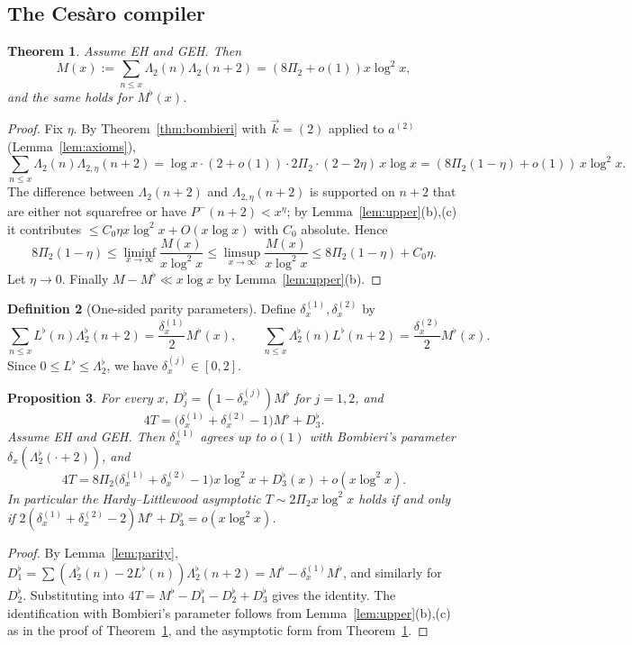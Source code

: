 \documentclass[11pt]{amsart}
\newtheorem{theorem}{Theorem}[section]
\newtheorem{proposition}[theorem]{Proposition}
\theoremstyle{definition}
\newtheorem{definition}[theorem]{Definition}
\theoremstyle{remark}
\newcommand{\Lflat}{\Lambda_2^{\flat}}
\begin{document}
\subsection{The Cesàro compiler}
\begin{theorem}\label{thm:M}
Assume EH and GEH. Then
\[
M(x):=\sum_{n\le x}\Lambda_2(n)\Lambda_2(n+2)=(8\Pi_2+o(1))x\log^2x,
\]
and the same holds for $M^\flat(x)$.
\end{theorem}
\begin{proof}
Fix $\eta$. By Theorem~\ref{thm:bombieri} with $\vec k=(2)$ applied to $a^{(2)}$ (Lemma~\ref{lem:axioms}),
\[
\sum_{n\le x}\Lambda_2(n)\Lambda_{2,\eta}(n+2)=\log x\cdot(2+o(1))\cdot2\Pi_2\cdot(2-2\eta)\,x\log x=(8\Pi_2(1-\eta)+o(1))\,x\log^2x .
\]
The difference between $\Lambda_2(n+2)$ and $\Lambda_{2,\eta}(n+2)$ is supported on $n+2$ that are either not squarefree or have $P^-(n+2)<x^\eta$; by Lemma~\ref{lem:upper}(b),(c) it contributes $\le C_0\eta x\log^2x+O(x\log x)$ with $C_0$ absolute. Hence
\[
8\Pi_2(1-\eta)\le\liminf_{x\to\infty}\frac{M(x)}{x\log^2x}\le\limsup_{x\to\infty}\frac{M(x)}{x\log^2x}\le8\Pi_2(1-\eta)+C_0\eta .
\]
Let $\eta\to0$. Finally $M-M^\flat\ll x\log x$ by Lemma~\ref{lem:upper}(b).
\end{proof}

\begin{definition}[One-sided parity parameters]\label{def:delta}
Define $\delta^{(1)}_x,\delta^{(2)}_x$ by
\[
\sum_{n\le x}L^\flat(n)\Lflat(n+2)=\frac{\delta^{(1)}_x}2M^\flat(x),\qquad\sum_{n\le x}\Lflat(n)L^\flat(n+2)=\frac{\delta^{(2)}_x}2M^\flat(x).
\]
Since $0\le L^\flat\le\Lflat$, we have $\delta^{(j)}_x\in[0,2]$.
\end{definition}

\begin{proposition}\label{prop:onepoint}
For every $x$, $D_j^\flat=(1-\delta^{(j)}_x)M^\flat$ for $j=1,2$, and
\[
4T=\bigl(\delta^{(1)}_x+\delta^{(2)}_x-1\bigr)M^\flat+D_3^\flat .
\]
Assume EH and GEH. Then $\delta^{(1)}_x$ agrees up to $o(1)$ with Bombieri's parameter $\delta_x(\Lflat(\cdot+2))$, and
\[
4T=8\Pi_2\bigl(\delta^{(1)}_x+\delta^{(2)}_x-1\bigr)x\log^2x+D_3^\flat(x)+o(x\log^2x).
\]
In particular the Hardy--Littlewood asymptotic $T\sim2\Pi_2x\log^2x$ holds if and only if $2(\delta^{(1)}_x+\delta^{(2)}_x-2)M^\flat+D_3^\flat=o(x\log^2x)$.
\end{proposition}
\begin{proof}
By Lemma~\ref{lem:parity}, $D_1^\flat=\sum(\Lflat(n)-2L^\flat(n))\Lflat(n+2)=M^\flat-\delta^{(1)}_xM^\flat$, and similarly for $D_2^\flat$. Substituting into $4T=M^\flat-D_1^\flat-D_2^\flat+D_3^\flat$ gives the identity. The identification with Bombieri's parameter follows from Lemma~\ref{lem:upper}(b),(c) as in the proof of Theorem~\ref{thm:M}, and the asymptotic form from Theorem~\ref{thm:M}.
\end{proof}
\end{document}
